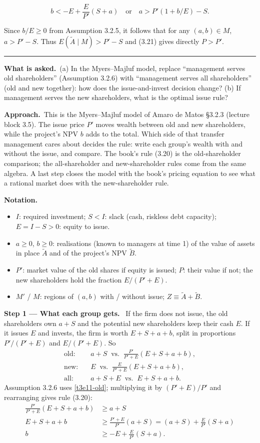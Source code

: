 \documentclass[11pt,a4paper]{article}
\newcommand{\notation}{\par\noindent\textbf{Notation.}}
\newcommand{\step}[2]{\par\medskip\noindent\textbf{Step #1 --- #2.}~}
\newcommand{\asked}{\par\medskip\noindent\textbf{What is asked.}~}
\newcommand{\approach}{\par\smallskip\noindent\textbf{Approach.}~}
\newcommand{\stmtend}{\par\endgroup\nopagebreak\noindent\rule{\linewidth}{0.4pt}\par\medskip}
\begin{document}
\[b < -E + \frac{E}{P'}(S + a) \quad \text{or} \quad a > P'(1 + b/E) - S.\]

Since \(b/E \geq 0\) from Assumption 3.2.5, it follows that for any \((a, b) \in M\),
\(a > P' - S\). Thus \(E(\widetilde{A} \mid M) > P' - S\) and (3.21) gives directly \(P > P'\).
\stmtend

\asked (a) In the Myers--Majluf model, replace ``management serves old shareholders'' (Assumption 3.2.6) with ``management serves all shareholders'' (old and new together): how does the issue-and-invest decision change? (b) If management serves the new shareholders, what is the optimal issue rule?

\approach This is the Myers--Majluf model of Amaro de Matos \S3.2.3 (lecture block 3.5). The issue price $P'$ moves wealth between old and new shareholders, while the project's NPV $b$ adds to the total. Which side of that transfer management cares about decides the rule: write each group's wealth with and without the issue, and compare. The book's rule (3.20) is the old-shareholder comparison; the all-shareholder and new-shareholder rules come from the same algebra. A last step closes the model with the book's pricing equation to see what a rational market does with the new-shareholder rule.

\notation
\begin{itemize}
  \item $I$: required investment; $S<I$: slack (cash, riskless debt capacity); $E=I-S>0$: equity to issue.
  \item $a\ge0$, $b\ge0$: realisations (known to managers at time 1) of the value of assets in place $\widetilde A$ and of the project's NPV $\widetilde B$.
  \item $P'$: market value of the old shares if equity is issued; $P$: their value if not; the new shareholders hold the fraction $E/(P'+E)$.
  \item $M'$ / $M$: regions of $(a,b)$ with / without issue; $Z\equiv\widetilde A+\widetilde B$.
\end{itemize}

\step{1}{What each group gets} If the firm does not issue, the old shareholders own $a+S$ and the potential
new shareholders keep their cash $E$. If it issues $E$ and invests, the firm is worth $E+S+a+b$, split
in proportions $P'/(P'+E)$ and $E/(P'+E)$. So
\begin{align}
  \text{old:}&\quad a+S \;\;\text{vs.}\;\; \frac{P'}{P'+E}(E+S+a+b), \label{t3e11-old}\\
  \text{new:}&\quad E \;\;\text{vs.}\;\; \frac{E}{P'+E}(E+S+a+b), \label{t3e11-new}\\
  \text{all:}&\quad a+S+E \;\;\text{vs.}\;\; E+S+a+b. \label{t3e11-all}
\end{align}
Assumption 3.2.6 uses \eqref{t3e11-old}; multiplying it by $(P'+E)/P'$ and rearranging gives rule (3.20):
\begin{align}
  \frac{P'}{P'+E}(E+S+a+b) &\ge a+S \nonumber\\
  E+S+a+b &\ge \frac{P'+E}{P'}(a+S) = (a+S)+\frac{E}{P'}(S+a) \nonumber\\
  b &\ge -E+\frac{E}{P'}(S+a). \tag{3.20}
\end{align}
\end{document}
